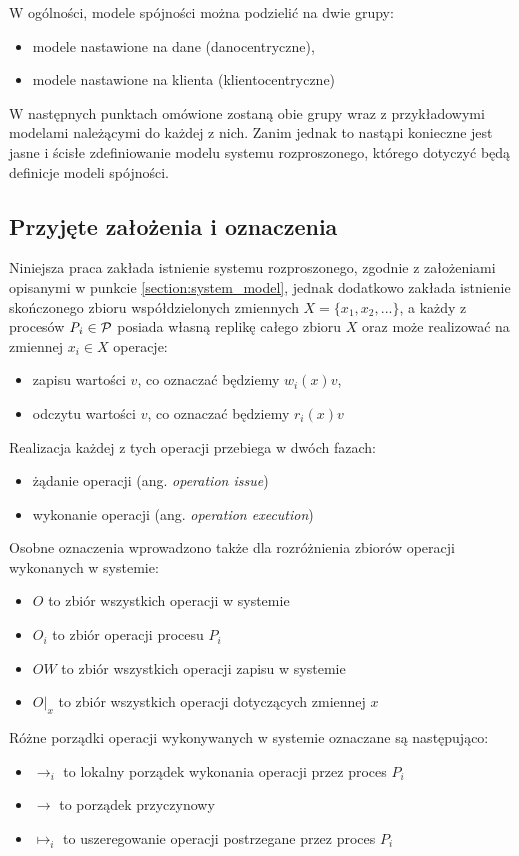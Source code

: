 W ogólności, modele spójności można podzielić na dwie grupy:
\begin{itemize}
    \item modele nastawione na dane (danocentryczne),
    \item modele nastawione na klienta (klientocentryczne)
\end{itemize}
W następnych punktach omówione zostaną obie grupy wraz z przykładowymi modelami należącymi do każdej z nich. Zanim jednak to nastąpi konieczne jest jasne i ścisłe zdefiniowanie modelu systemu rozproszonego, którego dotyczyć będą definicje modeli spójności.

\subsection{Przyjęte założenia i oznaczenia}

Niniejsza praca zakłada istnienie systemu rozproszonego, zgodnie z założeniami opisanymi w punkcie \ref{section:system_model}, jednak dodatkowo zakłada istnienie skończonego zbioru współdzielonych zmiennych $ X = \{x_1, x_2, ...\} $, a każdy z procesów $ \emph{P}_i \in \mathcal{P} $ posiada własną replikę całego zbioru $ X $ oraz może realizować na zmiennej $ x_i \in X $ operacje:
\begin{itemize}
    \item zapisu wartości $ v $, co oznaczać będziemy $ w_i(x)v $,
    \item odczytu wartości $ v $, co oznaczać będziemy $ r_i(x)v $
\end{itemize}
Realizacja każdej z tych operacji przebiega w dwóch fazach:
\begin{itemize}
    \item żądanie operacji (ang. \textit{operation issue})
    \item wykonanie operacji (ang. \textit{operation execution})
\end{itemize}
Osobne oznaczenia wprowadzono także dla rozróżnienia zbiorów operacji wykonanych w systemie:
\begin{itemize}
    \item $ O $ to zbiór wszystkich operacji w systemie
    \item $ O_i $ to zbiór operacji procesu $ P_i $
    \item $ OW $ to zbiór wszystkich operacji zapisu w systemie
    \item $ O|_x $ to zbiór wszystkich operacji dotyczących zmiennej $ x $
\end{itemize}
Różne porządki operacji wykonywanych w systemie oznaczane są następująco:
\begin{itemize}
    \item $ \rightarrow_i $ to lokalny porządek wykonania operacji przez proces $ P_i $
    \item $ \rightarrow $ to porządek przyczynowy
    \item $ \mapsto_i $ to uszeregowanie operacji postrzegane przez proces $ P_i $
\end{itemize}

